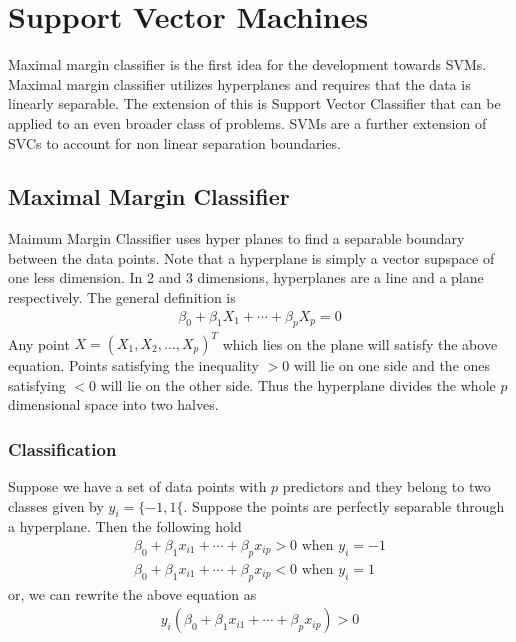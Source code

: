 \documentclass[../statistical_learning_notes.tex]{subfiles}
\begin{document}
    \chapter{Support Vector Machines}
    Maximal margin classifier is the first idea for the development towards SVMs. Maximal margin classifier utilizes hyperplanes and requires that the data is linearly separable. The extension of this is Support Vector Classifier that can be applied to an even broader class of problems. SVMs are a further extension of SVCs to account for non linear separation boundaries.
    

    \section{Maximal Margin Classifier}
    Maimum Margin Classifier uses hyper planes to find a separable boundary between the data points. Note that a hyperplane is simply a vector supspace of one less dimension. In 2 and 3 dimensions, hyperplanes are a line and a plane respectively. The general definition is
    \begin{align*}
        \beta_{0} + \beta_{1}X_{1} + \cdots + \beta_{p}X_{p} = 0
    \end{align*}
    Any point $X = (X_{1}, X_{2}, \ldots, X_{p})^{T}$ which lies on the plane will satisfy the above equation. Points satisfying the inequality $> 0$ will lie on one side and the ones satisfying $< 0$ will lie on the other side. Thus the hyperplane divides the whole $p$ dimensional space into two halves.\newline


    \subsection{Classification}
    Suppose we have a set of data points with $p$ predictors and they belong to two classes given by $y_{i} = \{-1 , 1\{$. Suppose the points are perfectly separable through a hyperplane. Then the following hold
    \begin{align*}
        \beta_{0} + \beta_{1}x_{i1} + \cdots + \beta_{p}x_{ip} > 0 \text{ when } y_{i} = -1\\
        \beta_{0} + \beta_{1}x_{i1} + \cdots + \beta_{p}x_{ip} < 0 \text{ when } y_{i} = 1
    \end{align*}
    or, we can rewrite the above equation as
    \begin{align*}
        y_{i}(\beta_{0} + \beta_{1}x_{i1} + \cdots + \beta_{p}x_{ip}) > 0
    \end{align*}
\end{document}
